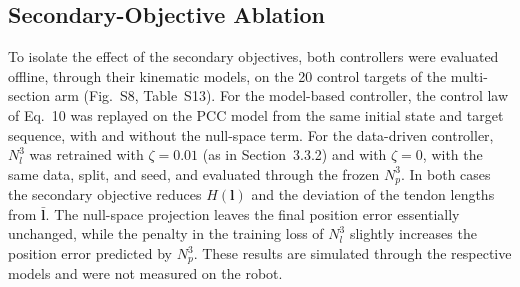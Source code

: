 \subsection{Secondary-Objective Ablation}
To isolate the effect of the secondary objectives, both controllers were evaluated offline, through their kinematic models, on the 20 control targets of the multi-section arm (Fig.~S8, Table~S13). For the model-based controller, the control law of Eq.~10 was replayed on the PCC model from the same initial state and target sequence, with and without the null-space term. For the data-driven controller, $N_l^3$ was retrained with $\zeta = 0.01$ (as in Section~3.3.2) and with $\zeta = 0$, with the same data, split, and seed, and evaluated through the frozen $N_p^3$. In both cases the secondary objective reduces $H(\mathbf{l})$ and the deviation of the tendon lengths from $\bar{\mathbf{l}}$. The null-space projection leaves the final position error essentially unchanged, while the penalty in the training loss of $N_l^3$ slightly increases the position error predicted by $N_p^3$. These results are simulated through the respective models and were not measured on the robot.
